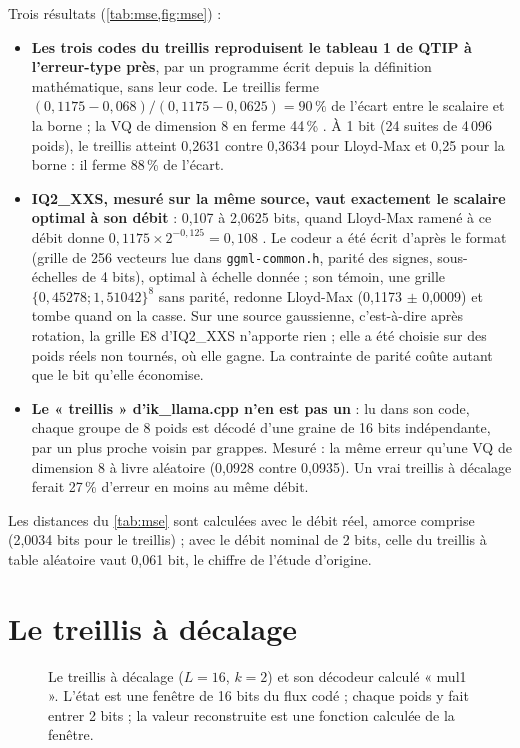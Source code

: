 Trois résultats (\cref{tab:mse,fig:mse}) :
\begin{itemize}
\item \textbf{Les trois codes du treillis reproduisent le tableau 1 de QTIP à l'erreur-type près}, par un programme écrit depuis la définition mathématique, sans leur code. Le treillis ferme $(0{,}1175 - 0{,}068)/(0{,}1175 - 0{,}0625) = 90\,\%$ de l'écart entre le scalaire et la borne ; la VQ de dimension 8 en ferme 44\,\% \calc. À 1 bit (24 suites de 4\,096 poids), le treillis atteint 0,2631 contre 0,3634 pour Lloyd-Max et 0,25 pour la borne : il ferme 88\,\% de l'écart.
\item \textbf{IQ2\_XXS, mesuré sur la même source, vaut exactement le scalaire optimal à son débit} : 0,107 à 2,0625 bits, quand Lloyd-Max ramené à ce débit donne $0{,}1175 \times 2^{-0{,}125} = 0{,}108$ \calc. Le codeur a été écrit d'après le format (grille de 256 vecteurs lue dans \texttt{ggml-common.h}, parité des signes, sous-échelles de 4 bits), optimal à échelle donnée ; son témoin, une grille $\{0{,}45278 ; 1{,}51042\}^8$ sans parité, redonne Lloyd-Max (0,1173 $\pm$ 0,0009) et tombe quand on la casse. Sur une source gaussienne, c'est-à-dire après rotation, la grille E8 d'IQ2\_XXS n'apporte rien ; elle a été choisie sur des poids réels non tournés, où elle gagne. La contrainte de parité coûte autant que le bit qu'elle économise.
\item \textbf{Le « treillis » d'ik\_llama.cpp n'en est pas un} : lu dans son code, chaque groupe de 8 poids est décodé d'une graine de 16 bits indépendante, par un plus proche voisin par grappes. Mesuré : la même erreur qu'une VQ de dimension 8 à livre aléatoire (0,0928 contre 0,0935). Un vrai treillis à décalage ferait 27\,\% d'erreur en moins au même débit.
\end{itemize}
Les distances du \cref{tab:mse} sont calculées avec le débit réel, amorce comprise (2,0034 bits pour le treillis) ; avec le débit nominal de 2 bits, celle du treillis à table aléatoire vaut 0,061 bit, le chiffre de l'étude d'origine.

\section{Le treillis à décalage}\label{sec:treillis}

\begin{figure}[ht]
\centering
\SchemaTreillis
\caption[Le treillis à décalage et son décodeur calculé]{Le treillis à décalage ($L = 16$, $k = 2$) et son décodeur calculé « mul1 ». L'état est une fenêtre de 16 bits du flux codé ; chaque poids y fait entrer 2 bits ; la valeur reconstruite est une fonction calculée de la fenêtre.}
\label{fig:treillis}
\end{figure}

